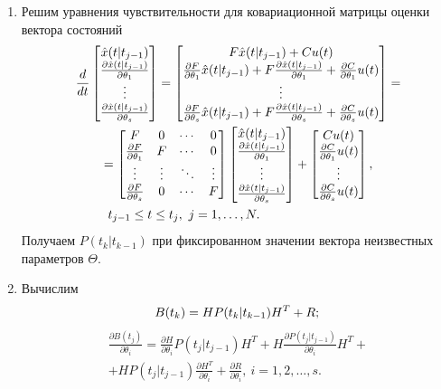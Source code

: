 \documentclass[a4paper,14pt]{extarticle}
\newcommand{\pd}[2]{\frac{\partial #1}{\partial #2}}
\begin{document}
\begin{enumerate}
\item Решим уравнения чувствительности для ковариационной матрицы оценки
	вектора состояний
\begin{multline*}
	\frac{d}{dt}	
	\begin{bmatrix}
		\hat{x}(t|t_{j-1}) \\
		\pd{\hat{x}(t|t_{j-1})}{\theta_1} \\
		\vdots \\
		\pd{\hat{x}(t|t_{j-1})}{\theta_s} \\
	\end{bmatrix} =
	\begin{bmatrix}
		F \hat{x}(t|t_{j-1}) + C u(t) \\
		\pd{F}{\theta_1} \hat{x}(t|t_{j-1}) + F \pd{\hat{x}(t|t_{j-1})}{\theta_1} +
			\pd{C}{\theta_1} u(t) \\
		\vdots \\
		\pd{F}{\theta_s} \hat{x}(t|t_{j-1}) + F \pd{\hat{x}(t|t_{j-1})}{\theta_s} +
			\pd{C}{\theta_s} u(t) 
	\end{bmatrix} = \\ =
	\begin{bmatrix}
		F & 0 & \cdots & 0 \\
		\pd{F}{\theta_1} & F & \cdots & 0 \\
		\vdots & \vdots & \ddots & \vdots \\
		\pd{F}{\theta_s} & 0 & \cdots & F
	\end{bmatrix}
	\begin{bmatrix}
		\hat{x}(t|t_{j-1}) \\
		\pd{\hat{x}(t|t_{j-1})}{\theta_1} \\
		\vdots \\
		\pd{\hat{x}(t|t_{j-1})}{\theta_s}
	\end{bmatrix} +
	\begin{bmatrix}
		C u(t) \\
		\pd{C}{\theta_1} u(t) \\
		\vdots \\
		\pd{C}{\theta_s} u(t)
	\end{bmatrix},\\ t_{j-1} \le t \le t_j,\ j = 1,\ldots,N.
	\hspace{0.25\textwidth}
\end{multline*}
Получаем $P(t_k|t_{k-1})$ при фиксированном значении вектора неизвестных
параметров $\Theta$.

\item Вычислим
\[
	B(t_k) = H P(t_k|t_{k-1}) H^T + R; \\
\]
\begin{multline*}
	\pd{B(t_j)}{\theta_i} = \pd{H}{\theta_i} P(t_j|t_{j-1}) H^T + H
	\pd{P(t_j|t_{j-1})}{\theta_i} H^T + \\ + H P(t_j|t_{j-1}) \pd{H^T}{\theta_i} +
	\pd{R}{\theta_i},\ i = 1, 2, \ldots, s.
\end{multline*}


\end{enumerate}
\end{document}
